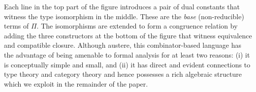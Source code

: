 Each line in the top part of the figure introduces a pair of dual constants that witness the type isomorphism in the
middle.  These are the \emph{base} (non-reducible) terms of $\Pi$. The isomorphisms are extended to form a congruence
relation by adding the three constructors at the bottom of the figure that witness equivalence and compatible
closure. Although austere, this combinator-based language has the advantage of being amenable to formal analysis for at
least two reasons: (i) it is conceptually simple and small, and (ii) it has direct and evident connections to type
theory and category theory and hence possesses a rich algebraic structure which we exploit in the remainder of the
paper.




